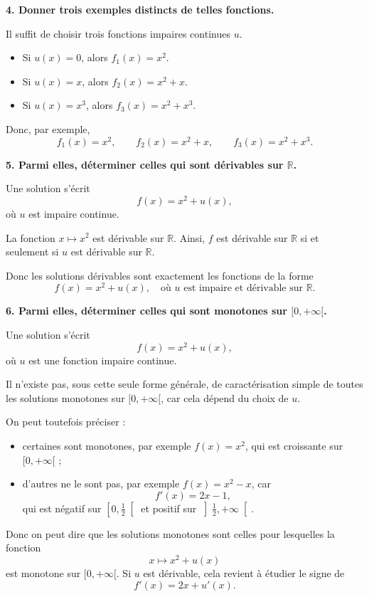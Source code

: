 \documentclass[11pt,a4paper]{article}
\newcommand{\R}{\mathbb{R}}
\begin{document}
\bigskip

\textbf{4. Donner trois exemples distincts de telles fonctions.}

Il suffit de choisir trois fonctions impaires continues \(u\).

\begin{itemize}[label=\(\bullet\)]
    \item Si \(u(x)=0\), alors \(f_1(x)=x^2\).
    \item Si \(u(x)=x\), alors \(f_2(x)=x^2+x\).
    \item Si \(u(x)=x^3\), alors \(f_3(x)=x^2+x^3\).
\end{itemize}

Donc, par exemple,
\[
\boxed{f_1(x)=x^2,\qquad f_2(x)=x^2+x,\qquad f_3(x)=x^2+x^3.}
\]

\bigskip

\textbf{5. Parmi elles, déterminer celles qui sont dérivables sur \(\R\).}

Une solution s'écrit
\[
f(x)=x^2+u(x),
\]
où \(u\) est impaire continue.

La fonction \(x\mapsto x^2\) est dérivable sur \(\R\). Ainsi, \(f\) est dérivable sur \(\R\) si et seulement si \(u\) est dérivable sur \(\R\).

Donc les solutions dérivables sont exactement les fonctions de la forme
\[
\boxed{f(x)=x^2+u(x),\quad \text{où } u \text{ est impaire et dérivable sur } \R.}
\]

\bigskip

\textbf{6. Parmi elles, déterminer celles qui sont monotones sur \([0,+\infty[\).}

Une solution s'écrit
\[
f(x)=x^2+u(x),
\]
où \(u\) est une fonction impaire continue.

Il n'existe pas, sous cette seule forme générale, de caractérisation simple de toutes les solutions monotones sur \([0,+\infty[\), car cela dépend du choix de \(u\).

On peut toutefois préciser :
\begin{itemize}[label=\(\bullet\)]
    \item certaines sont monotones, par exemple \(f(x)=x^2\), qui est croissante sur \([0,+\infty[\) ;
    \item d'autres ne le sont pas, par exemple \(f(x)=x^2-x\), car
    \[
    f'(x)=2x-1,
    \]
    qui est négatif sur \(\left[0,\frac12\right[\) et positif sur \(\left]\frac12,+\infty\right[\).
\end{itemize}

Donc on peut dire que les solutions monotones sont celles pour lesquelles la fonction
\[
x\longmapsto x^2+u(x)
\]
est monotone sur \([0,+\infty[\). Si \(u\) est dérivable, cela revient à étudier le signe de
\[
f'(x)=2x+u'(x).
\]
\end{document}
